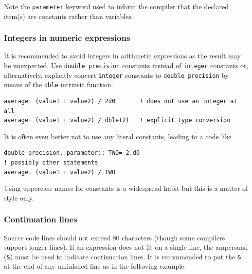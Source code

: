 \documentclass[onecolumn]{article}
\begin{document}
Note the \verb|parameter| keyword used to inform the compiler that the declared item(s) are constants rather than variables.

\subsubsection{Integers in numeric expressions}

It is recommended to avoid integers in arithmetic expressions as the result may be unexpected. Use \verb|double precision| constants instead of \verb|integer| constants or, alternatively, explicitly convert \verb|integer| constants to \verb|double precision| by means of the \verb|dble| intrinsic function.

\begin{shaded}
\begin{small}
\begin{verbatim}
average= (value1 + value2) / 2d0       ! does not use an integer at all
average= (value1 + value2) / dble(2)   ! explicit type conversion
\end{verbatim}
\end{small}
\end{shaded}

It is often even better not to use any literal constants, leading to a code like

\begin{shaded}
\begin{small}
\begin{verbatim}
double precision, parameter:: TWO= 2.d0
! possibly other statements
average= (value1 + value2) / TWO
\end{verbatim}
\end{small}
\end{shaded}

Using uppercase names for constants is a widespread habit but this is a matter of style only.

\subsubsection{Continuation lines}

Source code lines should not exceed 80 characters (though some  compilers support longer lines). If an expression does not fit on a single line, the ampersand (\verb|&|) must be used to indicate continuation lines. It is recommended to put the \verb|&| at the end of any unfinished line as in the following example:
\end{document}
